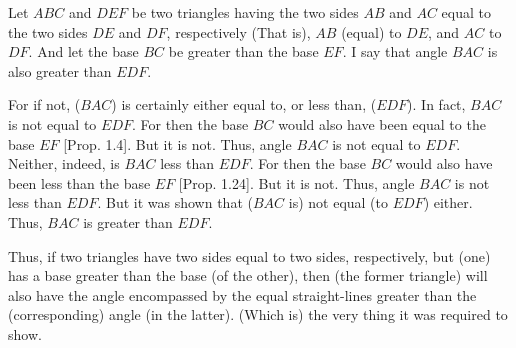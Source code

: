\begin{Parallel}{}{}
{Let $ABC$ and $DEF$ be  two triangles having the two sides $AB$ and $AC$
equal to the two sides $DE$ and $DF$, respectively (That is), $AB$ (equal) to $DE$, and $AC$ to $DF$. And let the base $BC$ be greater than the base $EF$. I say that angle
$BAC$ is also greater than $EDF$.

For if not, ($BAC$) is certainly either equal to, or less than, ($EDF$). In fact, $BAC$ is not equal to
$EDF$. For then the base $BC$ would also have been equal to the base $EF$ [Prop. 1.4]. But it is not.
Thus, angle $BAC$ is not equal to $EDF$. Neither, indeed, is $BAC$ less
than $EDF$. For then the base $BC$ would also have been less than the base $EF$ [Prop. 1.24].
But it is not. Thus, angle $BAC$ is not less than $EDF$. But it was  shown
that ($BAC$ is) not equal (to $EDF$) either. Thus, $BAC$ is greater than $EDF$.

Thus, if two triangles have two sides equal to two sides, respectively,
but (one) has a base greater than the base (of the other), then (the former triangle) will also have the angle encompassed by the equal straight-lines greater than the (corresponding) angle (in the latter). (Which is) the
very thing it was required to show.}
\end{Parallel}

